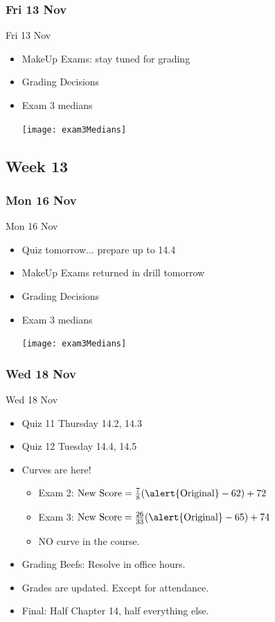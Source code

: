 \documentclass[12pt]{beamer}
\theoremstyle{plain}
\theoremstyle{definition}
\begin{document}
\subsubsection{Fri 13 Nov}
\begin{frame}{Fri 13 Nov}%
\begin{itemize}
\item MakeUp Exams: stay tuned for grading
\item Grading Decisions 
\item Exam 3 medians
\begin{center}
\texttt{[image: exam3Medians]}
\end{center}
\end{itemize}
\end{frame}

\subsection{Week 13}
\subsubsection{Mon 16 Nov}
\begin{frame}{Mon 16 Nov}%
\begin{itemize}
\item Quiz tomorrow... prepare up to 14.4
\item MakeUp Exams returned in drill tomorrow
\item Grading Decisions 
\item Exam 3 medians
\begin{center}
\texttt{[image: exam3Medians]}
\end{center}
\end{itemize}
\end{frame}

\subsubsection{Wed 18 Nov}
\begin{frame}{Wed 18 Nov}%
\begin{itemize}
\item Quiz 11 Thursday 14.2, 14.3
\item Quiz 12 Tuesday 14.4, 14.5
\item Curves are here!
	\begin{itemize}
	\item Exam 2: $\text{New Score}= \textstyle\frac{7}{8}(\alert{\text{Original}}-62)+72$
	\item Exam 3: $\text{New Score}= \textstyle\frac{26}{33}(\alert{\text{Original}}-65)+74$
	\item NO curve in the course.
	\end{itemize}
\item Grading Beefs: Resolve in office hours.
\item Grades are updated.  Except for attendance.
\item Final: Half Chapter 14, half everything else.
\end{itemize}
\end{frame}
\end{document}
